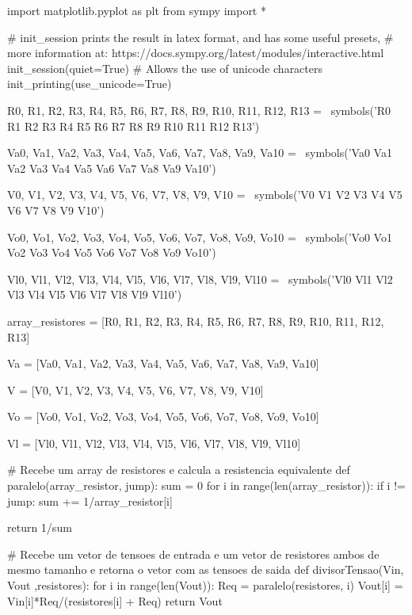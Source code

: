 \begin{python}
    import matplotlib.pyplot as plt
    from sympy import *

    # init_session prints the result in latex format, and has some useful presets,
    # more information at: https://docs.sympy.org/latest/modules/interactive.html
    init_session(quiet=True)
    # Allows the use of unicode characters
    init_printing(use_unicode=True)

    R0, R1, R2, R3, R4, R5, R6, R7, R8, R9, R10, R11, R12, R13 = \
    symbols('R0 R1 R2 R3 R4 R5 R6 R7 R8 R9 R10 R11 R12 R13')

    Va0, Va1, Va2, Va3, Va4, Va5, Va6, Va7, Va8, Va9, Va10 = \
    symbols('Va0 Va1 Va2 Va3 Va4 Va5 Va6 Va7 Va8 Va9 Va10')

    V0, V1, V2, V3, V4, V5, V6, V7, V8, V9, V10 = \
    symbols('V0 V1 V2 V3 V4 V5 V6 V7 V8 V9 V10')

    Vo0, Vo1, Vo2, Vo3, Vo4, Vo5, Vo6, Vo7, Vo8, Vo9, Vo10 = \
    symbols('Vo0 Vo1 Vo2 Vo3 Vo4 Vo5 Vo6 Vo7 Vo8 Vo9 Vo10')

    Vl0, Vl1, Vl2, Vl3, Vl4, Vl5, Vl6, Vl7, Vl8, Vl9, Vl10 = \
    symbols('Vl0 Vl1 Vl2 Vl3 Vl4 Vl5 Vl6 Vl7 Vl8 Vl9 Vl10')

    array_resistores = [R0, R1, R2, R3, R4, R5, R6, R7, R8, R9, R10, R11, R12, R13]

    Va = [Va0, Va1, Va2, Va3, Va4, Va5, Va6, Va7, Va8, Va9, Va10]

    V = [V0, V1, V2, V3, V4, V5, V6, V7, V8, V9, V10]

    Vo = [Vo0, Vo1, Vo2, Vo3, Vo4, Vo5, Vo6, Vo7, Vo8, Vo9, Vo10]

    Vl = [Vl0, Vl1, Vl2, Vl3, Vl4, Vl5, Vl6, Vl7, Vl8, Vl9, Vl10]

\end{python}

\begin{python}
    # Recebe um array de resistores e calcula a resistencia equivalente
    def paralelo(array_resistor, jump):
    sum = 0
    for i in range(len(array_resistor)):
    if i != jump:
    sum += 1/array_resistor[i]

    return 1/sum

    # Recebe um vetor de tensoes de entrada e um vetor de resistores ambos de mesmo tamanho e retorna o vetor com as tensoes de saida
    def divisorTensao(Vin, Vout ,resistores):
    for i in range(len(Vout)):
    Req = paralelo(resistores, i)
    Vout[i] = Vin[i]*Req/(resistores[i] + Req)
    return Vout
\end{python}

